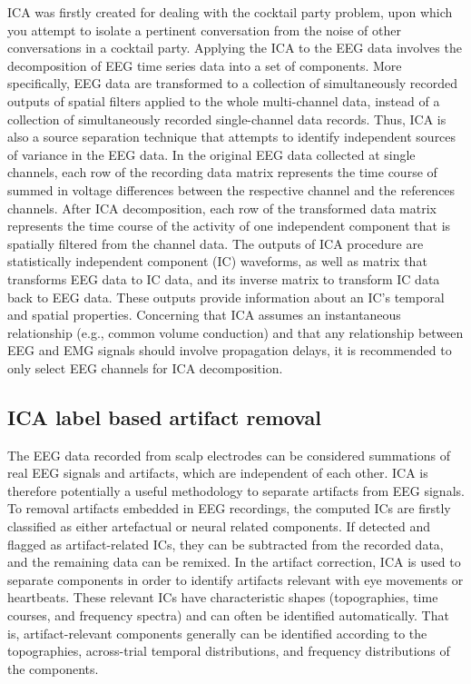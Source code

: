 \documentclass[12pt,a4paper,titlepage,openany]{report}
\begin{document}
ICA was ﬁrstly created for dealing with the cocktail party problem, upon which you attempt to isolate a pertinent conversation from the noise of other conversations in a cocktail party. Applying the ICA to the EEG data involves the decomposition of EEG time series data into a set of components. More speciﬁcally, EEG data are transformed to a collection of simultaneously recorded outputs of spatial ﬁlters applied to the whole multi-channel data, instead of a collection of simultaneously recorded single-channel data records. Thus, ICA is also a source separation technique that attempts to identify independent sources of variance in the EEG data. 
In the original EEG data collected at single channels, each row of the recording data matrix represents the time course of summed in voltage differences between the respective channel and the references channels. 
After ICA decomposition, each row of the transformed data matrix represents the time course of the activity of one independent component that is spatially ﬁltered from the channel data. 
The outputs of ICA procedure are statistically independent component (IC) waveforms, as well as matrix that transforms EEG data to IC data, and its inverse matrix to transform IC data back to EEG data. 
These outputs provide information about an IC’s temporal and spatial properties. Concerning that ICA assumes an instantaneous relationship (e.g., common volume conduction) and that any relationship between EEG and EMG signals should involve propagation delays, it is recommended to only select EEG channels for ICA decomposition.\cite{makkar2023}

\subsection{ICA label based artifact removal}

The EEG data recorded from scalp electrodes can be considered summations of real EEG signals and artifacts, which are independent of each other. ICA is therefore potentially a useful methodology to separate artifacts from EEG signals. To removal artifacts embedded in EEG recordings, the computed ICs are ﬁrstly classiﬁed as either artefactual or neural related components. If detected and ﬂagged as artifact-related ICs, they can be subtracted from the recorded data, and the remaining data can be remixed. In the artifact correction, ICA is used to separate components in order to identify artifacts relevant with eye movements or heartbeats. 
These relevant ICs have characteristic shapes (topographies, time courses, and frequency spectra) and can often be identiﬁed automatically. 
That is, artifact-relevant components generally can be identiﬁed according to the topographies, across-trial temporal distributions, and frequency distributions of the components. 
\end{document}
